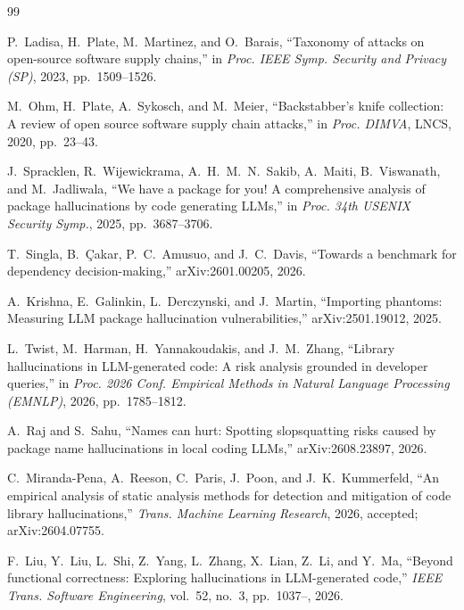 \documentclass[conference]{IEEEtran}
\begin{document}
\begin{thebibliography}{99}

P.~Ladisa, H.~Plate, M.~Martinez, and O.~Barais,
``Taxonomy of attacks on open-source software supply chains,''
in \emph{Proc. IEEE Symp. Security and Privacy (SP)}, 2023, pp.~1509--1526.

M.~Ohm, H.~Plate, A.~Sykosch, and M.~Meier,
``Backstabber's knife collection: A review of open source software supply chain attacks,''
in \emph{Proc. DIMVA}, LNCS, 2020, pp.~23--43.

J.~Spracklen, R.~Wijewickrama, A.~H.~M.~N.~Sakib, A.~Maiti, B.~Viswanath, and M.~Jadliwala,
``We have a package for you! A comprehensive analysis of package hallucinations by code generating LLMs,''
in \emph{Proc. 34th USENIX Security Symp.}, 2025, pp.~3687--3706.

T.~Singla, B.~{\c{C}}akar, P.~C.~Amusuo, and J.~C.~Davis,
``Towards a benchmark for dependency decision-making,'' arXiv:2601.00205, 2026.

A.~Krishna, E.~Galinkin, L.~Derczynski, and J.~Martin,
``Importing phantoms: Measuring LLM package hallucination vulnerabilities,'' arXiv:2501.19012, 2025.

L.~Twist, M.~Harman, H.~Yannakoudakis, and J.~M.~Zhang,
``Library hallucinations in LLM-generated code: A risk analysis grounded in developer queries,''
in \emph{Proc. 2026 Conf. Empirical Methods in Natural Language Processing (EMNLP)}, 2026, pp.~1785--1812.

A.~Raj and S.~Sahu,
``Names can hurt: Spotting slopsquatting risks caused by package name hallucinations in local coding LLMs,''
arXiv:2608.23897, 2026.

C.~Miranda-Pena, A.~Reeson, C.~Paris, J.~Poon, and J.~K.~Kummerfeld,
``An empirical analysis of static analysis methods for detection and mitigation of code library
hallucinations,'' \emph{Trans. Machine Learning Research}, 2026, accepted; arXiv:2604.07755.

F.~Liu, Y.~Liu, L.~Shi, Z.~Yang, L.~Zhang, X.~Lian, Z.~Li, and Y.~Ma, ``Beyond functional correctness: Exploring
hallucinations in LLM-generated code,'' \emph{IEEE Trans. Software Engineering}, vol.~52, no.~3, pp.~1037--, 2026.


\end{thebibliography}
\end{document}
